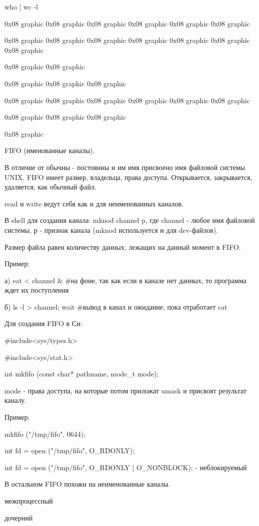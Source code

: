 who | wc -l

0x08 graphic
0x08 graphic
0x08 graphic
0x08 graphic
0x08 graphic
0x08 graphic

0x08 graphic
0x08 graphic
0x08 graphic
0x08 graphic
0x08 graphic
0x08 graphic
0x08 graphic

0x08 graphic
0x08 graphic

0x08 graphic
0x08 graphic
0x08 graphic

0x08 graphic
0x08 graphic
0x08 graphic
0x08 graphic
0x08 graphic
0x08 graphic

0x08 graphic
0x08 graphic
0x08 graphic

0x08 graphic

                      FIFO (именованные каналы).

В отличие от обычны - постоянны и им имя присвоено имя файловой
системы UNIX. FIFO имеет размер, владельца, права доступа.
Открывается, закрывается, удаляется, как обычный файл.

read и write ведут себя как и для неименованных каналов.

В shell для создания канала: mknod channel p, где channel - любое имя
файловой системы, р - признак канала (mknod используется и для
dev-файлов).

Размер файла равен количеству данных, лежащих на данный момент в FIFO.

Пример:

а) eat < channel & #на фоне, так как если в канале нет данных, то
программа ждет их поступления

б) ls -l > channel; wait #вывод в канал и ожидание, пока отработает
cat

Для создания FIFO в Си:

#include<sys/types.h>

#include<sys/stat.h>

int mkfifo (const char* pathname, mode_t mode);

mode - права доступа, на которые потом приложат umask и присвоят
результат каналу.

Пример:

mkfifo ("/tmp/fifo", 0644);

int fd = open ("/tmp/fifo", O_RDONLY);

int fd = open ("/tmp/fifo", O_RDONLY | O_NONBLOCK); - неблокируемый

В остальном FIFO похожи на неименованные каналы.

межпроцессный

дочерний

